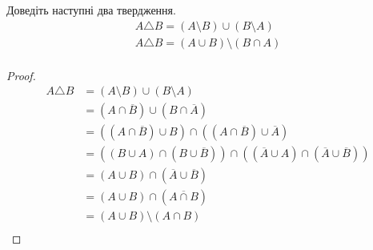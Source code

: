 \begin{example}
    Доведіть наступні два твердження.
    \begin{gather*}
        A \triangle B = (A \setminus B) \cup (B \setminus A)\\
        A \triangle B = (A \cup B) \setminus (B \cap A)\\
    \end{gather*}

    \begin{proof}
        \begin{equation*}
            \begin{split}
                A \triangle B
                & = (A \setminus B) \cup (B \setminus A)  \\
                & = (A \cap \overline{B}) \cup (B \cap \overline{A})  \\
                & = ((A \cap \overline{B}) \cup B) \cap ((A \cap \overline{B}) \cup \overline{A})  \\
                & = ((B \cup A) \cap (B \cup \overline{B}))
                \cap ((\overline{A} \cup A) \cap (\overline{A} \cup \overline{B}))  \\
                & = (A \cup B) \cap (\overline{A} \cup \overline{B})  \\
                & = (A \cup B) \cap (\overline{A \cap B})  \\
                & = (A \cup B) \setminus (A \cap B)  \\
            \end{split}
        \end{equation*}
    \end{proof}
\end{example}

